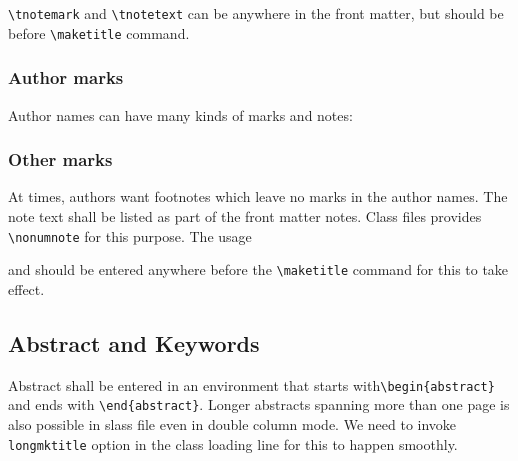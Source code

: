 \documentclass[a4paper,12pt]{article}
\begin{document}
\verb+\tnotemark+ and \verb+\tnotetext+ can be anywhere in
the front matter, but should be before \verb+\maketitle+ command.

\subsubsection{Author marks}

Author names can have many kinds of marks and notes:


\subsubsection{Other marks}

At times, authors want footnotes which leave no marks in
the author names. The note text shall be listed as part of
the front matter notes. Class files provides
\verb+\nonumnote+ for this purpose. The usage

\begin{vquote}
\end{vquote}

\noindent and should be entered anywhere before the \verb+\maketitle+
command for this to take effect. 

\subsection{Abstract and Keywords}

Abstract shall be entered in an environment that starts
with\break \verb+\begin{abstract}+ and ends with
\verb+\end{abstract}+. Longer abstracts spanning more than
one page is also possible in slass file even in double
column mode. We need to invoke \verb+longmktitle+ option in the
class loading line for this to happen smoothly.
\end{document}
